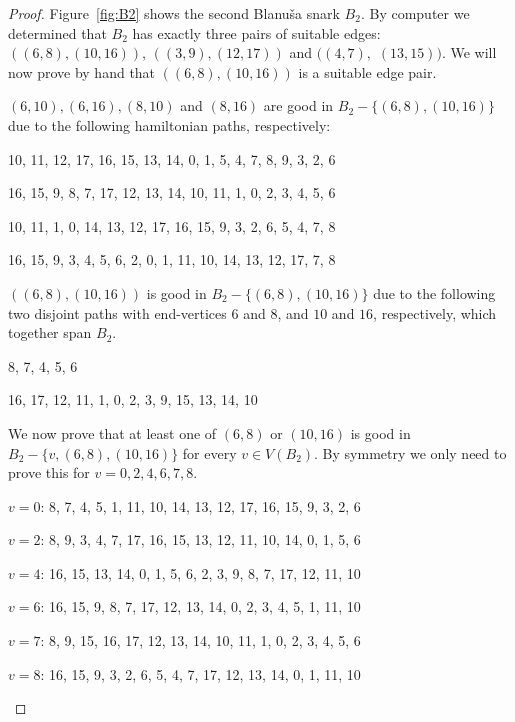 \documentclass{amcjoucc}
\begin{document}
\begin{proof}
Figure~\ref{fig:B2} shows the second Blanu\v{s}a snark $B_2$. By computer we determined that $B_2$ has exactly three pairs of suitable edges: $((6,8),(10,16))$, $((3,9),(12,17))$ and $((4,7),$ $(13,15))$. We will now prove by hand that $((6,8),(10,16))$ is a suitable edge pair.


$(6,10), (6,16), (8,10)$ and $(8,16)$ are good in $B_2 - \{(6,8),(10,16)\}$ due to the following hamiltonian paths, respectively:


\begin{itemize}
{\small
\item 10, 11, 12, 17, 16, 15, 13, 14, 0, 1, 5, 4, 7, 8, 9, 3, 2, 6
\item 16, 15, 9, 8, 7, 17, 12, 13, 14, 10, 11, 1, 0, 2, 3, 4, 5, 6
\item 10, 11, 1, 0, 14, 13, 12, 17, 16, 15, 9, 3, 2, 6, 5, 4, 7, 8
\item 16, 15, 9, 3, 4, 5, 6, 2, 0, 1, 11, 10, 14, 13, 12, 17, 7, 8}
\end{itemize}


$((6,8),(10,16))$ is good in $B_2 - \{(6,8),(10,16)\}$ due to the following two disjoint paths with end-vertices $6$ and $8$, and $10$ and $16$, respectively, which together span $B_2$.

\begin{itemize}
{\small
\item 8, 7, 4, 5, 6
\item 16, 17, 12, 11, 1, 0, 2, 3, 9, 15, 13, 14, 10}
\end{itemize}


We now prove that at least one of $(6,8)$ or $(10,16)$ is good in $B_2 - \{v,(6,8),(10,16)\}$ for every $v \in V(B_2)$. By symmetry we only need to prove this for $v=0,2,4,6,7,8$.
\begin{itemize}
{\footnotesize
\item $v = 0$: 8, 7, 4, 5, 1, 11, 10, 14, 13, 12, 17, 16, 15, 9, 3, 2, 6
\item $v = 2$: 8, 9, 3, 4, 7, 17, 16, 15, 13, 12, 11, 10, 14, 0, 1, 5, 6
\item $v = 4$: 16, 15, 13, 14, 0, 1, 5, 6, 2, 3, 9, 8, 7, 17, 12, 11, 10
\item $v = 6$: 16, 15, 9, 8, 7, 17, 12, 13, 14, 0, 2, 3, 4, 5, 1, 11, 10
\item $v = 7$: 8, 9, 15, 16, 17, 12, 13, 14, 10, 11, 1, 0, 2, 3, 4, 5, 6
\item $v = 8$: 16, 15, 9, 3, 2, 6, 5, 4, 7, 17, 12, 13, 14, 0, 1, 11, 10
}
\end{itemize}
\end{proof}
\end{document}
